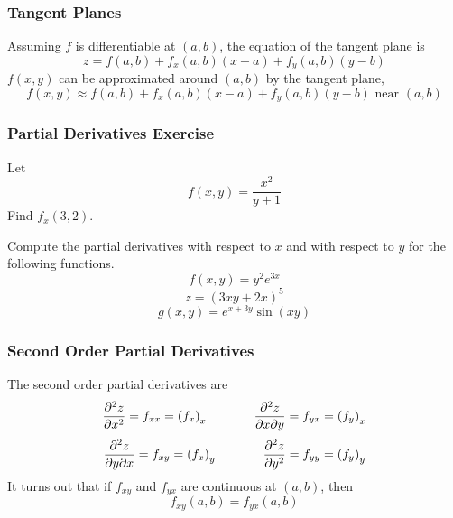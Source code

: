 \documentclass[xcolor=dvipsnames]{beamer}
\begin{document}
\begin{frame}
  \frametitle{Tangent Planes}
  Assuming $f$ is differentiable at $(a,b)$, the equation of the
  tangent plane is
  \begin{equation}
    \label{eq:aoseenai}
z=f(a,b)+f_{x}(a,b)(x-a)+f_{y}(a,b)(y-b)
  \end{equation}
  $f(x,y)$ can be approximated around $(a,b)$ by the tangent plane,
  \begin{equation}
    \label{eq:xabixaic}
    f(x,y)\approx{}f(a,b)+f_{x}(a,b)(x-a)+f_{y}(a,b)(y-b)\mbox{ near }(a,b)
  \end{equation}
\end{frame}

\begin{frame}
  \frametitle{Partial Derivatives Exercise}
  {\ubung} Let
  \begin{equation}
    \label{eq:oacheapo}
    f(x,y)=\frac{x^{2}}{y+1}
  \end{equation}
  Find $f_{x}(3,2)$.

  \bigskip

  {\ubung} Compute the partial derivatives with respect to $x$ and
  with respect to $y$ for the following functions.
  \begin{equation}
    \label{eq:phiwoowe}
    f(x,y)=y^{2}e^{3x}
  \end{equation}
  \begin{equation}
    \label{eq:uphaijei}
    z=(3xy+2x)^{5}
  \end{equation}
  \begin{equation}
    \label{eq:geebeshi}
    g(x,y)=e^{x+3y}\sin(xy)
  \end{equation}
\end{frame}

\begin{frame}
  \frametitle{Second Order Partial Derivatives}
  The \alert{second order partial derivatives} are
  \begin{equation}
    \label{eq:eshaipie}
    \frac{\partial^{2}z}{\partial{}x^{2}}=f_{xx}=\left(f_{x}\right)_{x}\hspace{0.5in}\frac{\partial^{2}z}{\partial{}x\partial{}y}=f_{yx}=\left(f_{y}\right)_{x}
  \end{equation}
  \begin{equation}
    \label{eq:waukahna}
    \frac{\partial^{2}z}{\partial{}y\partial{}x}=f_{xy}=\left(f_{x}\right)_{y}\hspace{0.5in}\frac{\partial^{2}z}{\partial{}y^{2}}=f_{yy}=\left(f_{y}\right)_{y}
  \end{equation}
  It turns out that if $f_{xy}$ and $f_{yx}$ are continuous at
  $(a,b)$, then
  \begin{equation}
    \label{eq:ahbahxuj}
    f_{xy}(a,b)=f_{yx}(a,b)
  \end{equation}
\end{frame}
\end{document}
